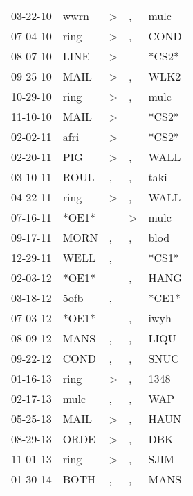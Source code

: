 \begin{supertabular}{lllll}
 03-22-10 &   wwrn &     \textgreater &                , &   mulc \\
 07-04-10 &   ring &     \textgreater &                , &   COND \\
 08-07-10 &   LINE &     \textgreater &                  &  *CS2* \\
 09-25-10 &   MAIL &     \textgreater &                , &   WLK2 \\
 10-29-10 &   ring &     \textgreater &                , &   mulc \\
 11-10-10 &   MAIL &     \textgreater &                  &  *CS2* \\
 02-02-11 &   afri &     \textgreater &                  &  *CS2* \\
 02-20-11 &    PIG &     \textgreater &                , &   WALL \\
 03-10-11 &   ROUL &                , &                , &   taki \\
 04-22-11 &   ring &     \textgreater &                , &   WALL \\
 07-16-11 &  *OE1* &                  &     \textgreater &   mulc \\
 09-17-11 &   MORN &                , &                , &   blod \\
 12-29-11 &   WELL &                , &                  &  *CS1* \\
 02-03-12 &  *OE1* &                  &                , &   HANG \\
 03-18-12 &   5ofb &                , &                  &  *CE1* \\
 07-03-12 &  *OE1* &                  &                , &   iwyh \\
 08-09-12 &   MANS &                , &                , &   LIQU \\
 09-22-12 &   COND &                , &                , &   SNUC \\
 01-16-13 &   ring &     \textgreater &                , &   1348 \\
 02-17-13 &   mulc &                , &                , &    WAP \\
 05-25-13 &   MAIL &     \textgreater &                , &   HAUN \\
 08-29-13 &   ORDE &     \textgreater &                , &    DBK \\
 11-01-13 &   ring &     \textgreater &                , &   SJIM \\
 01-30-14 &   BOTH &                , &                , &   MANS \\

\end{supertabular}
